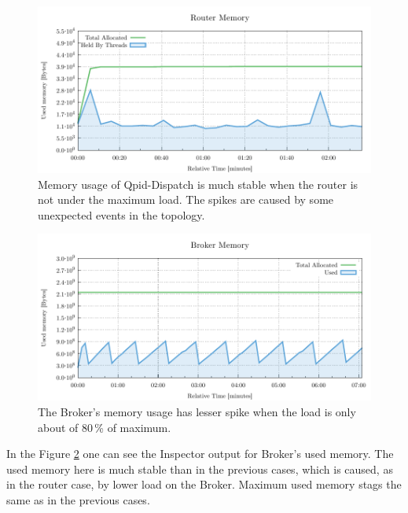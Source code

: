 \begin{figure}[H]
	\centering
	\includegraphics[width=1\linewidth]{obrazky-figures/charts/singlepoint-router-latency-memory.pdf}
	\caption{Memory usage of Qpid-Dispatch is much stable when the router is not under the maximum load. The spikes are caused by some unexpected events in the topology.}
	\label{fig:latency-single-router-memory}
\end{figure}


\begin{figure}[H]
	\centering
	\includegraphics[width=1\linewidth]{obrazky-figures/charts/singlepoint-broker-latency-memory.pdf}
	\caption{The Broker's memory usage has lesser spike when the load is only about of 80\,\% of maximum.}
	\label{fig:latency-single-broker-memory}
\end{figure}

In the Figure \ref{fig:latency-single-broker-memory} one can see the Inspector output for Broker's used memory. The used memory here is much stable than in the previous cases, which is caused, as in the router case, by lower load on the Broker. Maximum used memory stags the same as in the previous cases.

